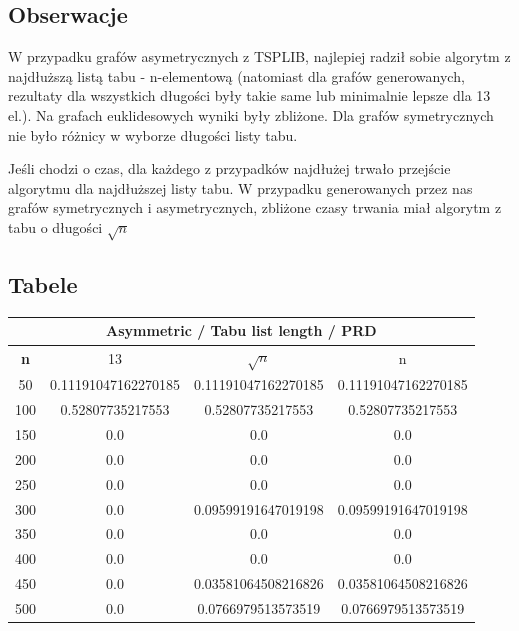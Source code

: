 \documentclass{article}
\begin{document}
\subsection{Obserwacje}

W przypadku grafów asymetrycznych z TSPLIB, najlepiej radził sobie algorytm z najdłuższą listą tabu - n-elementową (natomiast dla grafów generowanych, rezultaty dla wszystkich długości były takie same lub minimalnie lepsze dla 13 el.). Na grafach euklidesowych wyniki były zbliżone. Dla grafów symetrycznych nie było różnicy w wyborze długości listy tabu.

Jeśli chodzi o czas, dla każdego z przypadków najdłużej trwało przejście algorytmu dla najdłuższej listy tabu. W przypadku generowanych przez nas grafów symetrycznych i asymetrycznych, zbliżone czasy trwania miał algorytm z tabu o długości $\sqrt{n}$

\subsection{Tabele}

\begin{center}
\begin{tabular}{|c|c|c|c|}
\hline
\multicolumn{4}{|c|}{\textbf{Asymmetric / Tabu list length / PRD}}\\
\hline
\textbf{n} & 13 & $\sqrt{n}$ & n\\
\hline
50 & 0.11191047162270185 & 0.11191047162270185 & 0.11191047162270185\\
\hline
100 & 0.52807735217553 & 0.52807735217553 & 0.52807735217553\\
\hline
150 & 0.0 & 0.0 & 0.0\\
\hline
200 & 0.0 & 0.0 & 0.0\\
\hline
250 & 0.0 & 0.0 & 0.0\\
\hline
300 & 0.0 & 0.09599191647019198 & 0.09599191647019198\\
\hline
350 & 0.0 & 0.0 & 0.0\\
\hline
400 & 0.0 & 0.0 & 0.0\\
\hline
450 & 0.0 & 0.03581064508216826 & 0.03581064508216826\\
\hline
500 & 0.0 & 0.0766979513573519 & 0.0766979513573519\\
\hline
\end{tabular}
\end{center}
\end{document}
